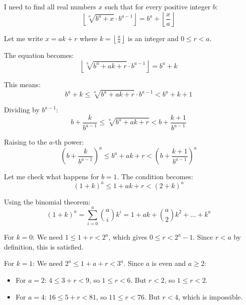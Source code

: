 \documentclass[12pt,a4paper]{article}
\theoremstyle{definition}
\begin{document}
        I need to find all real numbers $x$ such that for every positive integer $b$:
        \begin{equation}
            \left\lfloor \sqrt[a]{b^a + x} \cdot b^{a-1} \right\rfloor = b^a + \left\lfloor \frac{x}{a} \right\rfloor
        \end{equation}

        Let me write $x = ak + r$ where $k = \left\lfloor \frac{x}{a} \right\rfloor$ is an integer and $0 \leq r < a$.

        The equation becomes:
        \begin{equation}
            \left\lfloor \sqrt[a]{b^a + ak + r} \cdot b^{a-1} \right\rfloor = b^a + k
        \end{equation}

        This means:
        \begin{equation}
            b^a + k \leq \sqrt[a]{b^a + ak + r} \cdot b^{a-1} < b^a + k + 1
        \end{equation}

        Dividing by $b^{a-1}$:
        \begin{equation}
            b + \frac{k}{b^{a-1}} \leq \sqrt[a]{b^a + ak + r} < b + \frac{k+1}{b^{a-1}}
        \end{equation}

        Raising to the $a$-th power:
        \begin{equation}
            \left(b + \frac{k}{b^{a-1}}\right)^a \leq b^a + ak + r < \left(b + \frac{k+1}{b^{a-1}}\right)^a
        \end{equation}

        Let me check what happens for $b = 1$. The condition becomes:
        \begin{equation}
        (1 + k)^a \leq 1 + ak + r < (2 + k)^a
        \end{equation}

        Using the binomial theorem:
        \begin{equation}
        (1 + k)^a = \sum_{i=0}^{a} \binom{a}{i} k^i = 1 + ak + \binom{a}{2}k^2 + \ldots + k^a
        \end{equation}

        For $k = 0$: We need $1 \leq 1 + r < 2^a$, which gives $0 \leq r < 2^a - 1$. Since $r < a$ by definition, this is satisfied.

        For $k = 1$: We need $2^a \leq 1 + a + r < 3^a$. Since $a$ is even and $a \geq 2$:
        \begin{itemize}
            \item For $a = 2$: $4 \leq 3 + r < 9$, so $1 \leq r < 6$. But $r < 2$, so $1 \leq r < 2$.
            \item For $a = 4$: $16 \leq 5 + r < 81$, so $11 \leq r < 76$. But $r < 4$, which is impossible.
        \end{itemize}
\end{document}
